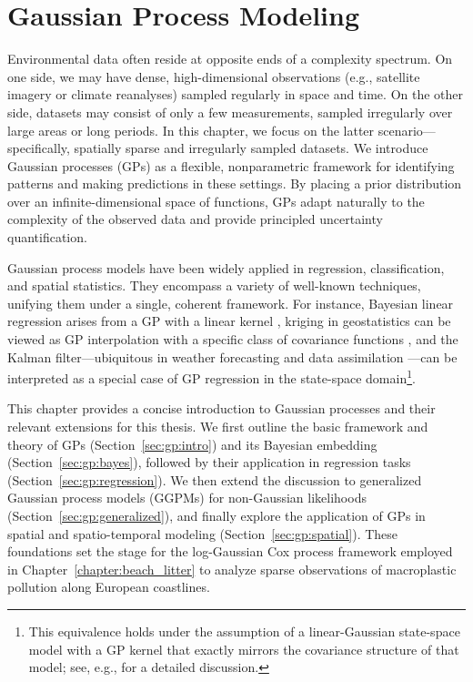 \ifpdf
    \graphicspath{{content/chapter4/figs/raster/}{content/chapter4/figs/pdf/}{content/chapter4/figs/}}
    \else
    \graphicspath{{content/chapter4/figs/vector/}{content/chapter4/figs/}}
\fi


\chapter{Gaussian Process Modeling}\label{chapter:gpr}

Environmental data often reside at opposite ends of a complexity spectrum. On one side, we may have dense, high-dimensional observations (e.g., satellite imagery or climate reanalyses) sampled regularly in space and time. On the other side, datasets may consist of only a few measurements, sampled irregularly over large areas or long periods. In this chapter, we focus on the latter scenario---specifically, spatially sparse and irregularly sampled datasets. We introduce Gaussian processes (GPs) as a flexible, nonparametric framework for identifying patterns and making predictions in these settings. By placing a prior distribution over an infinite-dimensional space of functions, GPs adapt naturally to the complexity of the observed data and provide principled uncertainty quantification.

Gaussian process models have been widely applied in regression, classification, and spatial statistics. They encompass a variety of well-known techniques, unifying them under a single, coherent framework. For instance, Bayesian linear regression arises from a GP with a linear kernel \cite[cf.][]{mackay_introduction_1998}, kriging in geostatistics can be viewed as GP interpolation with a specific class of covariance functions \cite[cf.][]{cressie_statistics_1993}, and the Kalman filter---ubiquitous in weather forecasting and data assimilation \cite[e.g.][]{evensen_ensemble_2003}---can be interpreted as a special case of GP regression in the state-space domain\footnote{This equivalence holds under the assumption of a linear-Gaussian state-space model with a GP kernel that exactly mirrors the covariance structure of that model; see, e.g., \citet{hartikainen_kalman_2010} for a detailed discussion.}.

This chapter provides a concise introduction to Gaussian processes and their relevant extensions for this thesis. We first outline the basic framework and theory of GPs (Section~\ref{sec:gp:intro}) and its Bayesian embedding (Section~\ref{sec:gp:bayes}), followed by their application in regression tasks (Section~\ref{sec:gp:regression}). We then extend the discussion to generalized Gaussian process models (GGPMs) for non-Gaussian likelihoods (Section~\ref{sec:gp:generalized}), and finally explore the application of GPs in spatial and spatio-temporal modeling (Section~\ref{sec:gp:spatial}). These foundations set the stage for the log-Gaussian Cox process framework employed in Chapter~\ref{chapter:beach_litter} to analyze sparse observations of macroplastic pollution along European coastlines.

